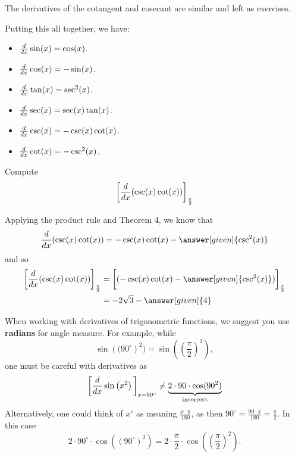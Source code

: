 \documentclass{ximera}
\begin{document}
The derivatives of the cotangent and cosecant are similar and left as
exercises. 

Putting this all together, we have:

\begin{theorem} \hfil
\begin{itemize}
\item $\frac{d}{dx} \sin(x) = \cos(x)$.
\item $\frac{d}{dx} \cos(x) = -\sin(x)$.
\item $\frac{d}{dx} \tan(x) = \sec^2(x)$.
\item $\frac{d}{dx} \sec(x) = \sec(x)\tan(x)$.
\item $\frac{d}{dx} \csc(x) = -\csc(x)\cot(x)$.
\item $\frac{d}{dx} \cot(x) = -\csc^2(x)$.
\end{itemize}
\end{theorem}

\begin{example}
Compute
\[
\bigg[ \frac{d}{dx} ( \csc(x) \cot(x) ) \bigg]_{\frac{\pi}{3}}
\]
\begin{explanation}
Applying the product rule and Theorem 4, we know that
\[
\ddx ( \csc(x) \cot(x) ) = - \csc(x) \cot(x) - \answer[given]{\csc^2(x)}
\]
and so
\begin{align*}
\eval{\ddx ( \csc(x) \cot(x) )}_{\frac{\pi}{3}} &= \eval{ (- \csc(x) \cot(x) - \answer[given]{\csc^2(x)})}_{\frac{\pi}{3}}  \\
&= - 2 \sqrt{3} - \answer[given]{4}
\end{align*}
\end{explanation}
\end{example}


\begin{warning}
When working with derivatives of trigonometric functions, we suggest
you use \textbf{radians} for angle measure. For example, while
\[
\sin\left((90^\circ\right)^2) = \sin\left(\left(\frac{\pi}{2}\right)^2\right),
\]
one must be careful with derivatives as
\[
\bigg[ \frac{d}{dx} \sin\left(x^2\right) \bigg]_{x=90^\circ} \ne \underbrace{2\cdot 90\cdot \cos(90^2)}_{\text{incorrect}}
\]
Alternatively, one could think of $x^\circ$ as meaning
$\frac{x\cdot\pi}{180}$, as then $90^\circ = \frac{90\cdot\pi}{180} =
\frac{\pi}{2}$. In this case
\[
2\cdot 90^\circ\cdot \cos((90^\circ)^2) = 2\cdot \frac{\pi}{2}\cdot\cos\left(\left(\frac{\pi}{2}\right)^2\right).
\]
\end{warning}
\end{document}

